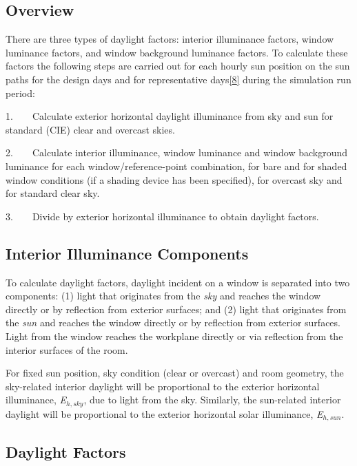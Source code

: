 \subsection{Overview}\label{overview-013}

There are three types of daylight factors: interior illuminance factors, window luminance factors, and window background luminance factors. To calculate these factors the following steps are carried out for each hourly sun position on the sun paths for the design days and for representative days\protect\hyperlink{ux5fftn8}{{[}8{]}} during the simulation run period:

1.~~~~Calculate exterior horizontal daylight illuminance from sky and sun for standard (CIE) clear and overcast skies.

2.~~~~Calculate interior illuminance, window luminance and window background luminance for each window/reference-point combination, for bare and for shaded window conditions (if a shading device has been specified), for overcast sky and for standard clear sky.

3.~~~~Divide by exterior horizontal illuminance to obtain daylight factors.

\subsection{Interior Illuminance Components}\label{interior-illuminance-components}

To calculate daylight factors, daylight incident on a window is separated into two components: (1) light that originates from the \emph{sky} and reaches the window directly or by reflection from exterior surfaces; and (2) light that originates from the \emph{sun} and reaches the window directly or by reflection from exterior surfaces. Light from the window reaches the workplane directly or via reflection from the interior surfaces of the room.

For fixed sun position, sky condition (clear or overcast) and room geometry, the sky-related interior daylight will be proportional to the exterior horizontal illuminance, \emph{E\(_{h,sky}\)}, due to light from the sky. Similarly, the sun-related interior daylight will be proportional to the exterior horizontal solar illuminance, \emph{E\(_{h,sun}\)}.

\subsection{Daylight Factors}\label{daylight-factors}

